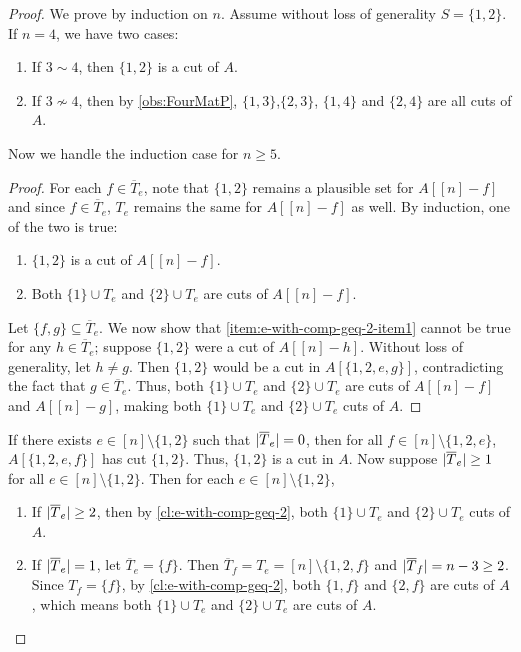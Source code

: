 \documentclass[11pt,letterpaper]{article}
\DeclarePairedDelimiter{\card}{|}{|}
\newcommand{\comp}[1]{\overline{#1}}
\newtheorem{claim}{Claim}[section]
\begin{document}
{{{\begin{proof}
We prove by induction on $n$. Assume without loss of generality $S = \{1,2\}$. If $n=4$, we have two cases:
\begin{enumerate}
    \item If $3 \sim 4$, then $\{1,2\}$ is a cut of $A$.
    \item If $3 \not\sim 4$, then by \cref{obs:FourMatP}, $\{1,3\}$,$\{2,3\}$, $\{1,4\}$ and $\{2,4\}$ are all cuts of $A$.
\end{enumerate}
Now we handle the induction case for $n\geq5$.


\begin{proof}
For each $f \in \comp{T}_e$, note that $\{1,2\}$ remains a plausible set for $A[[n] - f]$ and since $f\in \comp{T}_e$, $T_e$ remains the same for $A[[n] - f]$ as well. By induction, one of the two is true:
\begin{enumerate}
    \item\label{item:e-with-comp-geq-2-item1} $\{1,2\}$ is a cut of $A[[n] - f]$.
    \item Both $\{1\} \cup T_e$ and $\{2\} \cup T_e$ are cuts of $A[[n] - f]$.
\end{enumerate}

Let $\{f,g\} \subseteq \comp{T}_e$. We now show that \cref{item:e-with-comp-geq-2-item1} cannot be true for any $h \in \comp{T}_e$; suppose $\{1,2\}$ were a cut of $A[[n]-h]$. Without loss of generality, let $h\neq g$.  Then $\{1,2\}$ would be a cut in $A[\{1,2,e,g\}]$, contradicting the fact that $g \in \comp{T}_e$. Thus, both $\{1\} \cup T_e$ and $\{2\} \cup T_e$ are cuts of $A[[n] - f]$ and $A[[n] - g]$, making both $\{1\} \cup T_e$ and $\{2\} \cup T_e$ cuts of $A$.

\end{proof}

If there exists $e \in [n] \setminus \{1,2\}$ such that $\card{\comp{T}_e} = 0$, then for all $f \in [n] \setminus \{1,2,e\}$, $A[\{1,2,e,f\}]$ has cut $\{1,2\}$. Thus, $\{1,2\}$ is a cut in $A$.
Now suppose $\card{\comp{T}_e} \geq 1$ for all $e \in [n] \setminus \{1,2\}$. Then for each $e \in [n] \setminus \{1,2\}$,
\begin{enumerate}
    \item If $\card{\comp{T}_e} \geq 2$, then by \cref{cl:e-with-comp-geq-2}, both $\{1\} \cup T_e$ and $\{2\} \cup T_e$ cuts of $A$.
    \item If $\card{\comp{T}_e} = 1$, let $\comp{T}_e = \{f\}$. Then $\comp{T}_f = T_e = [n] \setminus \{1,2,f\}$ and $\card{\comp{T}_f} = n -3 \geq 2$. Since $T_f = \{f\}$, by \cref{cl:e-with-comp-geq-2}, both $\{1,f\}$ and $\{2,f\}$ are cuts of $A$, which means both $\{1\} \cup T_e$ and $\{2\} \cup T_e$ are cuts of $A$.
\end{enumerate}


\end{proof}}}}
\end{document}
